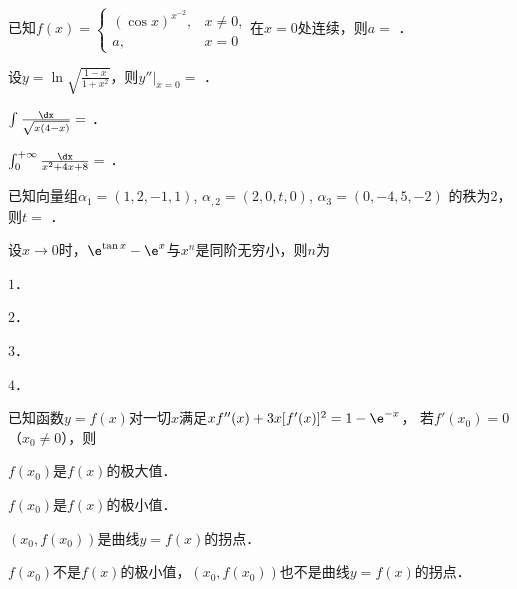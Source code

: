 \documentclass[plain,noanswer,medmath]{../../template/jnuexam}
\begin{document}






\begin{problem}
已知$f(x) = \begin{cases}
  (\cos x)^{x^{-2}}, & x \ne 0, \\
                  a, & x = 0
\end{cases}$在$x = 0$处连续，则$a =$ \fillin{}．
\end{problem}


\begin{problem}
设$y = \ln \sqrt{\frac{1 - x}{1 + x^2}}$，则$y''\big|_{x = 0} =$ \fillin{}．
\end{problem}


\begin{problem}
$\int_{}^{} \frac{\dx}{\sqrt{x(4 - x)}} =$ \fillin{}．
\end{problem}


\begin{problem}
$\int_0^{+\infty} \frac{\dx}{x^2 + 4x + 8} =$ \fillin{}．
\end{problem}


\begin{problem}
已知向量组$\alpha_1 = (1,2, - 1,1)$, $\alpha_{,2} = (2,0,t,0)$, $\alpha_3 = (0, - 4,5, - 2)$
的秩为$2$，则$t =$ \fillin{}．
\end{problem}




\begin{problem}
设$x \to 0$时，$\e^{\tan x} - \e^x$与$x^n$是同阶无穷小，则$n$为\pickout{}
\begin{abcd}
\item $1$．			
\item $2$．			
\item $3$．			
\item $4$．
\end{abcd}
\end{problem}




\begin{problem}
已知函数$y = f(x)$对一切$x$满足$xf''(x) + 3x[f'(x)]^2 = 1 - \e^{- x}$，
若$f'(x_0) = 0$（$x_0 \ne 0$），则\pickout{}
\begin{abcd}
\item $f(x_0)$是$f(x)$的极大值．
\item $f(x_0)$是$f(x)$的极小值．
\item $(x_0,f(x_0))$是曲线$y = f(x)$的拐点．
\item $f(x_0)$不是$f(x)$的极小值，$(x_0,f(x_0))$也不是曲线$y = f(x)$的拐点．
\end{abcd}
\end{problem}
\end{document}
